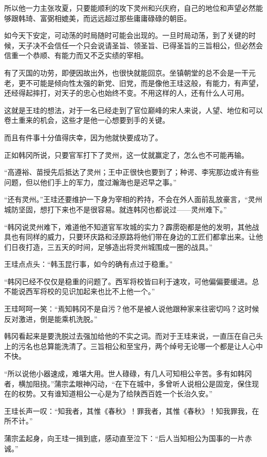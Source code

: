 所以他一力主张攻夏，只要能顺利的攻下灵州和兴庆府，自己的地位和声望必然能够跟韩琦、富弼相媲美，而远远超过那些庸庸碌碌的朝臣。

如今天下安定，可动荡的时局随时可能会出现的。一旦时局动荡，到了关键的时候，天子决不会信任一个只会说请圣旨、领圣旨、已得圣旨的三旨相公，但必然会信重一个恭顺、有能力而又不乏实绩的宰相。

有了灭国的功劳，即便因故出外，也很快就能回京。坐镇朝堂的总不会是一干元老，更不可能是倾向性太强的新党、旧党，而是像他王珪这般，有能力，有声望，还经得起摔打，对天子的忠心也始终不变。不用这样的人，还有什么人可用。

这就是王珪的想法，对于一名已经走到了官位巅峰的宋人来说，人望、地位和可以卷土重来的机会，这些才是他一心想要到手的关键。

而且有件事十分值得庆幸，因为他就快要成功了。

正如韩冈所说，只要官军打下了灵州，这一仗就赢定了，怎么也不可能再输。

“高遵裕、苗授先后抵达了灵州；王中正很快也要到了；种谔、李宪那边或许有些问题，但以他们手上的军力，度过瀚海也是迟早之事。”

“还有灵州。”王珪还要维护一下身为宰相的矜持，不会在外人面前乱放豪言，“灵州城防坚固，想打下来也不是很容易。就连韩冈也都说过——灵州难下。”

“韩冈说灵州难下，难道他不知道官军攻城的实力？霹雳砲都是他的发明，其他战具也有同样的威力，只要环庆路和泾原路将他们带在身边的工匠们都拿出来。让他们日夜打造，三五天的时间，足够造出将灵州城围成一圈的战具。”

王珪点点头：“韩玉昆行事，如今的确有点过于稳重。”

“韩冈已经不仅仅是稳重的问题了。西军将校皆曰利于速攻，可他偏偏要缓进。总不能说西军将校的见识加起来也比不上他一个。”

王珪呵呵一笑：“焉知韩冈不是自污？他不是被人说他跟种家来往密切吗？这时候反对激进，倒是能乘机洗脱。”

韩冈看起来是要洗脱过去强加给他的不实之词。而对于王珪来说，一直压在自己头上的污名也总算能洗清了。三旨相公和至宝丹，两个绰号无论哪一个都是让人心中不快。

“所以说他小器速成，难堪大用。世人碌碌，有几人可知相公辛苦。多有如韩冈者，横加阻挠。”蒲宗孟眼神闪动，“在下在城中，多曾听人说相公是固宠，保住现在的权势。又有谁知道相公一心是为了给陕西百姓一个长治久安。”

王珪长声一叹：“知我者，其惟《春秋》！罪我者，其惟《春秋》！知我罪我，在所不计。”

蒲宗孟起身，向王珪一揖到底，感动直至泣下：“后人当知相公为国事的一片赤诚。”

